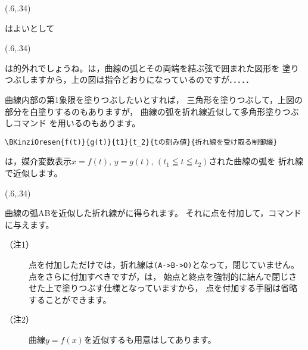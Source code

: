 \begin{showEx}(.6,.34){}
  \def\Ft{T-sin(T)}
  \def\Gt{1-cos(T)}
\end{showEx}
はよいとして

\begin{showEx}(.6,.34){}
  \def\Ft{cos(T)**3}
  \def\Gt{sin(T)**3}
\end{showEx}
は的外れでしょうね。は，曲線の弧とその両端を結ぶ弦で囲まれた図形を
塗りつぶしますから，上の図は指令どおりになっているのですが．．．．．

曲線内部の第1象限を塗りつぶしたいとすれば，
三角形を塗りつぶして，上図の部分を白塗りするのもありますが，
曲線の弧を折れ線近似して多角形塗りつぶしコマンド を用いるのもあります。

\begin{boxnote}
\begin{verbatim}
\BKinziOresen{f(t)}{g(t)}{t1}{t_2}{tの刻み値}{折れ線を受け取る制御綴}
\end{verbatim}
\end{boxnote}
\noindent
は，媒介変数表示$x=f(t)$, $y=g(t)$, $(t_1\leqq t\leqq t_2)$された曲線の弧を
折れ線で近似します。

\begin{showEx}(.6,.34){}
  \def\Ft{cos(T)**3}
  \def\Gt{sin(T)**3}
\end{showEx}
曲線の弧ABを近似した折れ線がに得られます。
それに点を付加して，コマンドに与えます。

\begin{description}
\item[（注1）]
点を付加しただけでは，折れ線は\verb+(A->B->O)+となって，閉じていません。
点をさらに付加すべきですが，は，
始点と終点を強制的に結んで閉じさせた上で塗りつぶす仕様となっていますから，
点を付加する手間は省略することができます。

\item[（注2）]
曲線$y=f(x)$を近似するも用意はしてあります。
\end{description}

